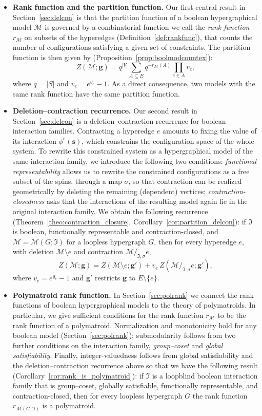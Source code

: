 \documentclass[11pt,reqno]{amsart}
\newcommand{\vecs}{\boldsymbol{s}}
\newcommand{\vecg}{\boldsymbol{g}}
\newcommand{\Mo}{\mathcal{M}}
\newcommand{\IFam}{\mathfrak{I}}
\theoremstyle{plain}
\theoremstyle{definition}
\numberwithin{equation}{section}
\begin{document}
\begin{itemize}
    \item \textbf{Rank function and the partition function.} Our first central result in Section~\ref{sec:delcon} is that the partition function of a boolean hypergraphical model $\Mo$ is governed by a combinatorial function we call the \emph{rank function} $r_\Mo$ on subsets of the hyperedges (Definition~\ref{def:rankfunc}), that counts the number of configurations satisfying a given set of constraints. The partition function is then given by (Proposition~\ref{prop:boolmodcountex}):
    \[
        Z(\Mo; \vecg) = q^{|V|} \sum_{A \subseteq E} q^{-r_\Mo(A)} \prod_{e \in A} v_e,
    \]
    where $q = |S|$ and $v_e = e^{g_e} - 1$. As a direct consequence, two models with the same rank function have the same partition function.

    \item \textbf{Deletion--contraction recurrence.} Our second result in Section~\ref{sec:delcon} is a deletion--contraction recurrence for boolean interaction families.
    Contracting a hyperedge $e$ amounts to fixing the value of its interaction $\phi^e(\vecs)$, which constrains the configuration space of the whole system.
    To rewrite this constrained system as a hypergraphical model of the same interaction family, we introduce the following two conditions:
    \emph{functional representability} allows us to rewrite the constrained configurations as a free subset of the spins, through a map $\sigma$, so that contraction can be realized geometrically by deleting the remaining (dependent) vertices; \emph{contraction-closedness} asks that the interactions of the resulting model again lie in the original interaction family. We obtain the following recurrence
    (Theorem~\ref{theo:contraction_closure}, Corollary~\ref{cor:partition_delcon}): if $\IFam$ is boolean, functionally representable and contraction-closed, and $\Mo = \Mo(G; \IFam)$ for a loopless hypergraph $G$, then for every hyperedge $e$, with deletion $\Mo \setminus e$ and contraction $\Mo /_{\IFam, \sigma}e$,
    \[
        Z(\Mo; \vecg) = Z(\Mo \setminus e; \vecg') + v_e\, Z(\Mo /_{\IFam,\sigma} e; \vecg'),
    \]
    where $v_e = e^{g_e} - 1$ and $\vecg'$ restricts $\vecg$ to $E \setminus \{e\}$.

    \item \textbf{Polymatroid rank function.} In Section~\ref{sec:polrank} we connect the rank functions of boolean hypergraphical models to the theory of polymatroids. In particular, we give sufficient conditions for the rank function $r_\Mo$ to be the rank function of a polymatroid. Normalization and monotonicity hold for any boolean model (Section~\ref{sec:polrank}); submodularity follows from two further conditions on the interaction family, \emph{group--coset} and \emph{global satisfiability}. Finally, integer-valuedness follows from global satisfiability and the deletion--contraction recurrence above so that we have the following result (Corollary~\ref{cor:rank_is_polymatroid}): if $\IFam$ is a loopblind boolean interaction family that is group--coset, globally satisfiable, functionally representable, and contraction-closed, then for every loopless hypergraph $G$ the rank function $r_{\Mo(G;\IFam)}$ is a polymatroid.
\end{itemize}
\end{document}
